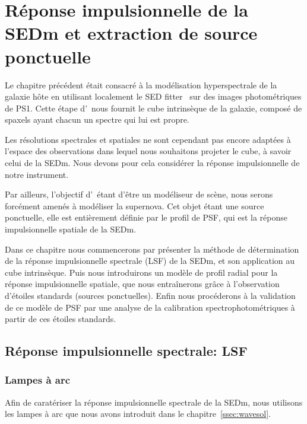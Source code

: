 \documentclass[../main/main.tex]{subfiles}
\begin{document}
\setcounter{chapter}{5}
\chapter{Réponse impulsionnelle de la SEDm et extraction de source ponctuelle}\label{ch:irf}
\minitoc
\vspace{2cm}
Le chapitre précédent était consacré à la modélisation hyperspectrale de
la galaxie hôte en utilisant localement le SED fitter \cigale\ sur des
images photométriques de PS1. Cette étape d'\hypergal\ nous fournit le
cube intrinsèque de la galaxie, composé de spaxels ayant chacun un
spectre qui lui est propre.

Les résolutions spectrales et spatiales ne sont cependant pas encore
adaptées à l'espace des observations dans lequel nous souhaitons projeter
le cube, à savoir celui de la SEDm. Nous devons pour cela considérer la
réponse impulsionnelle de notre instrument.

Par ailleurs, l'objectif d'\hypergal\ étant d'être un modéliseur de
scène, nous serons forcément amenés à modéliser la supernova. Cet objet
étant une source ponctuelle, elle est entièrement définie par le profil
de PSF, qui est la réponse impulsionnelle spatiale de la SEDm.

Dans ce chapitre nous commencerons par présenter la méthode de
détermination de la réponse impulsionnelle spectrale (LSF) de la SEDm,
et son application au cube intrinsèque. Puis nous introduirons un modèle
de profil radial pour la réponse impulsionnelle spatiale, que nous
entraînerons grâce à l'observation d'étoiles standards (sources
ponctuelles). Enfin nous procéderons à la validation de ce modèle de PSF par
une analyse de la calibration spectrophotométriques à partir de ces
étoiles standards.
\newpage

\section{Réponse impulsionnelle spectrale: LSF}

\subsection{Lampes à arc}

Afin de caratériser la réponse impulsionnelle spectrale de la SEDm, nous
utilisons les lampes à arc que nous avons introduit dans le
chapitre~\ref{ssec:wavesol}.
\end{document}
